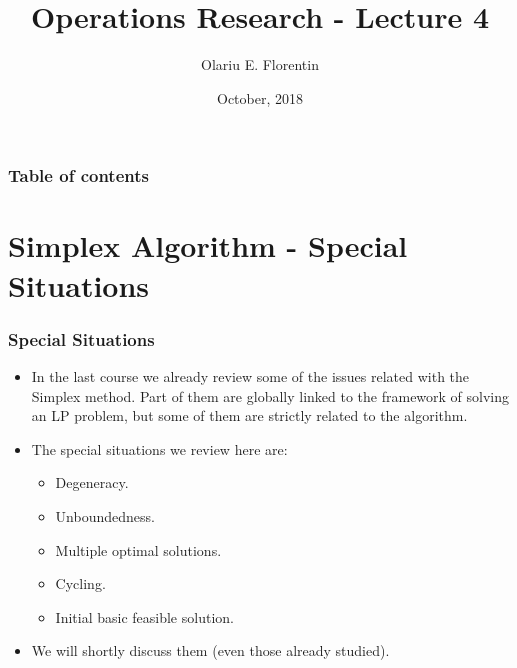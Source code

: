 \documentclass{beamer}
\theoremstyle{plain}
\begin{document}
\title{Operations Research - Lecture 4}  
\author{Olariu E. Florentin}
\date{October, 2018} 
\begin{frame}
\titlepage
\end{frame}

\begin{frame}\frametitle{Table of contents}\tableofcontents
\end{frame}

\section{Simplex Algorithm - Special Situations}
\begin{frame}\frametitle{Special Situations}
\justifying

\begin{itemize}
\justifying

\item In the last course we already review some of the issues related with the Simplex method. Part of them are globally linked to the framework of solving an LP problem, but some of them are strictly related to the algorithm.

\item The special situations we review here are:

\begin{itemize}
\justifying

\item Degeneracy.

\item Unboundedness.

\item Multiple optimal solutions.

\item Cycling.

\item Initial basic feasible solution.

\end{itemize}

\item We will shortly discuss them (even those already studied).

\end{itemize}

\end{frame}
\end{document}
